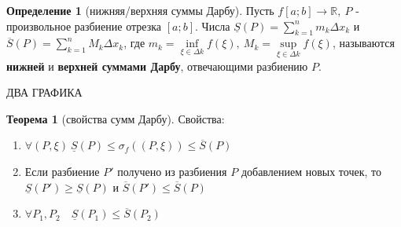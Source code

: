 \documentclass{report}
\theoremstyle{definition}
\newtheorem{definition}{Определение}[section]
\newtheorem{theorem}{Теорема}[section]
\begin{document}
\begin{definition}[нижняя/верхняя суммы Дарбу]
  Пусть $f[a;b] \rightarrow \mathbb{R}, \ P$ - произвольное разбиение отрезка $[a;b]$. Числа
  $\underline{S}(P) = \sum_{k=1}^{n}m_{k}\Delta x_{k}$ и $\overline{S}(P) = \sum_{k=1}^{n}M_{k}
    \Delta x_{k}$, где $m_{k} = \underset{\xi \in \Delta k}{\inf}f(\xi), \ M_{k} = \underset{\xi\in\Delta k}
    {\sup}f(\xi)$, называются \textbf{нижней} и \textbf{верхней суммами Дарбу}, отвечающими разбиению $P$.

    {\Huge ДВА ГРАФИКА}
\end{definition}

\begin{theorem}[свойства сумм Дарбу]
  Свойства:
  \begin{enumerate}
    \item $\forall(P,\xi) \ \underline{S}(P)\leqslant\sigma_{f}((P,\xi))\leqslant\overline{S}(P)$
    \item Если разбиение $P'$ получено из разбиения $P$ добавлением новых точек, то $\underline{S}
            (P') \geqslant \underline{S}(P)$ и $\overline{S}(P')\leqslant\overline{S}(P)$
    \item $\forall P_{1},P_{2} \quad \underline{S}(P_{1})\leqslant\overline{S}(P_{2})$
  \end{enumerate}
\end{theorem}
\end{document}
